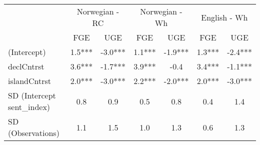 \begin{longtable}{lcccccc}
\toprule
 & \multicolumn{2}{c}{Norwegian - RC} & \multicolumn{2}{c}{Norwegian - Wh} & \multicolumn{2}{c}{English - Wh} \\ 
\cmidrule(lr){2-3} \cmidrule(lr){4-5} \cmidrule(lr){6-7}
  & FGE & UGE & FGE & UGE & FGE & UGE \\ 
\midrule\addlinespace[2.5pt]
(Intercept) & 1.5*** & -3.0*** & 1.1*** & -1.9*** & 1.3*** & -2.4*** \\ 
declCntrst & 3.6*** & -1.7*** & 3.9*** & -0.4 & 3.4*** & -1.1*** \\ 
islandCntrst & 2.0*** & -3.0*** & 2.2*** & -2.0*** & 2.0*** & -3.0*** \\ 
SD (Intercept sent\_index) & 0.8 & 0.9 & 0.5 & 0.8 & 0.4 & 1.4 \\ 
SD (Observations) & 1.1 & 1.5 & 1.0 & 1.3 & 0.6 & 1.3 \\ 
\bottomrule
\end{longtable}

